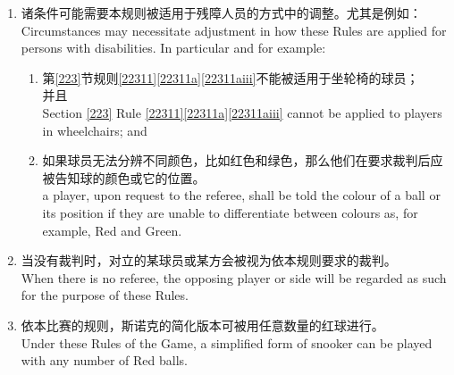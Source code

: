 \begin{enumerate}
    \item 诸条件可能需要本规则被适用于残障人员的方式中的调整。尤其是例如：\\
    Circumstances may necessitate adjustment in how these Rules are applied for persons with disabilities. In particular and for example:
    \begin{enumerate}
        \item 第\ref{223}节规则\ref{22311}\ref{22311a}\ref{22311aiii}不能被适用于坐轮椅的球员；\\并且\\
        Section \ref{223} Rule \ref{22311}\ref{22311a}\ref{22311aiii} cannot be applied to players in wheelchairs; and
        \item 如果球员无法分辨不同颜色，比如红色和绿色，那么他们在要求裁判后应被告知球的颜色或它的位置。\\
        a player, upon request to the referee, shall be told the colour of a ball or its position if they are unable to differentiate between colours as, for example, Red and Green.
    \end{enumerate}
    \item 当没有裁判时，对立的某球员或某方会被视为依本规则要求的裁判。\\
    When there is no referee, the opposing player or side will be regarded as such for the purpose of these Rules.
    \item 依本比赛的规则，斯诺克的简化版本可被用任意数量的红球进行。\\
    Under these Rules of the Game, a simplified form of snooker can be played with any number of Red balls.
\end{enumerate}
